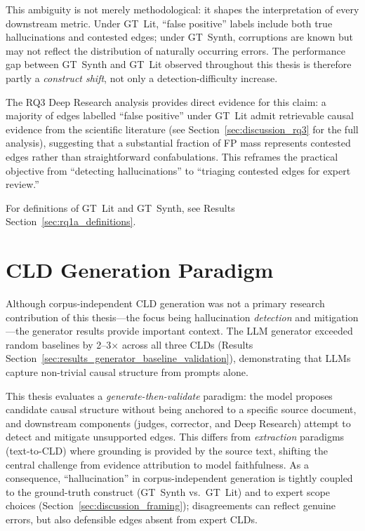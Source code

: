 This ambiguity is not merely methodological: it shapes the interpretation of every downstream metric. Under GT~Lit, ``false positive'' labels include both true hallucinations and contested edges; under GT~Synth, corruptions are known but may not reflect the distribution of naturally occurring errors. The performance gap between GT~Synth and GT~Lit observed throughout this thesis is therefore partly a \emph{construct shift}, not only a detection-difficulty increase.

The RQ3 Deep Research analysis provides direct evidence for this claim: a majority of edges labelled ``false positive'' under GT~Lit admit retrievable causal evidence from the scientific literature (see Section~\ref{sec:discussion_rq3} for the full analysis), suggesting that a substantial fraction of FP mass represents contested edges rather than straightforward confabulations. This reframes the practical objective from ``detecting hallucinations'' to ``triaging contested edges for expert review.''

For definitions of GT~Lit and GT~Synth, see Results Section~\ref{sec:rq1a_definitions}.

\section{CLD Generation Paradigm}
\label{sec:discussion_generation_paradigm}
Although corpus-independent CLD generation was not a primary research contribution of this thesis---the focus being hallucination \emph{detection} and mitigation---the generator results provide important context. The LLM generator exceeded random baselines by 2--3$\times$ across all three CLDs (Results Section~\ref{sec:results_generator_baseline_validation}), demonstrating that LLMs capture non-trivial causal structure from prompts alone.

This thesis evaluates a \emph{generate-then-validate} paradigm: the model proposes candidate causal structure without being anchored to a specific source document, and downstream components (judges, corrector, and Deep Research) attempt to detect and mitigate unsupported edges. This differs from \emph{extraction} paradigms (text-to-CLD) where grounding is provided by the source text, shifting the central challenge from evidence attribution to model faithfulness. As a consequence, ``hallucination'' in corpus-independent generation is tightly coupled to the ground-truth construct (GT~Synth vs.\ GT~Lit) and to expert scope choices (Section~\ref{sec:discussion_framing}); disagreements can reflect genuine errors, but also defensible edges absent from expert CLDs.

